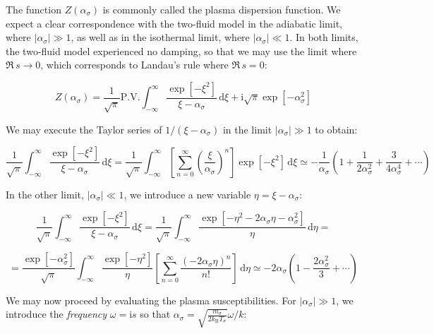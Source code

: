The function $Z(\alpha_\sigma)$ is commonly called the plasma dispersion function. We expect a clear correspondence with the two-fluid model in the adiabatic limit, where $|\alpha_\sigma|\gg1$, as well as in the isothermal limit, where $|\alpha_\sigma|\ll1$. In both limits, the two-fluid model experienced no damping, so that we may use the limit where $\Re\,s\to0$, which corresponds to Landau's rule where $\Re\,s=0$:

\begin{equation}
    Z(\alpha_\sigma)=\frac{1}{\sqrt{\pi}}\text{P.V.}\int_{-\infty}^\infty\frac{\exp{[-\xi^2]}}{\xi-\alpha_\sigma}\,\mathrm{d}\xi+\mathrm{i}\sqrt{\pi}\exp{[-\alpha_\sigma^2]}
\end{equation}

We may execute the Taylor series of $1/(\xi-\alpha_\sigma)$ in the limit $|\alpha_\sigma|\gg1$ to obtain:

\begin{equation}
    \frac{1}{\sqrt{\pi}}\int_{-\infty}^\infty\frac{\exp{[-\xi^2]}}{\xi-\alpha_\sigma}\,\mathrm{d}\xi=\frac{1}{\sqrt{\pi}}\int_{-\infty}^\infty\left[\sum_{n=0}^\infty\left(\frac{\xi}{\alpha_\sigma}\right)^n\right]\exp{[-\xi^2]}\,\mathrm{d}\xi\simeq-\frac{1}{\alpha_\sigma}\left(1+\frac{1}{2\alpha_\sigma^2}+\frac{3}{4\alpha_\sigma^4}+\cdots\right)
\end{equation}

In the other limit, $|\alpha_\sigma|\ll1$, we introduce a new variable $\eta=\xi-\alpha_\sigma$:

\begin{equation}
    \frac{1}{\sqrt{\pi}}\int_{-\infty}^\infty\frac{\exp{[-\xi^2]}}{\xi-\alpha_\sigma}\,\mathrm{d}\xi=\frac{1}{\sqrt{\pi}}\int_{-\infty}^\infty\frac{\exp{\left[-\eta^2-2\alpha_\sigma\eta-\alpha_\sigma^2\right]}}{\eta}\,\mathrm{d}\eta=
\end{equation}

\begin{equation}
    =\frac{\exp{[-\alpha_\sigma^2]}}{\sqrt{\pi}}\int_{-\infty}^\infty\frac{\exp{\left[-\eta^2\right]}}{\eta}\left[\sum_{n=0}^\infty\frac{(-2\alpha_\sigma\eta)^n}{n!}\right]\,\mathrm{d}\eta\simeq-2\alpha_\sigma\left(1-\frac{2\alpha_\sigma^2}{3}+\cdots\right)
\end{equation}

We may now proceed by evaluating the plasma susceptibilities. For $|\alpha_\sigma|\gg1$, we introduce the \textit{frequency} $\omega=\mathrm{i}s$ so that $\alpha_\sigma=\sqrt{\frac{m_\sigma}{2k_\mathrm{B}T_\sigma}}\omega/k$:

